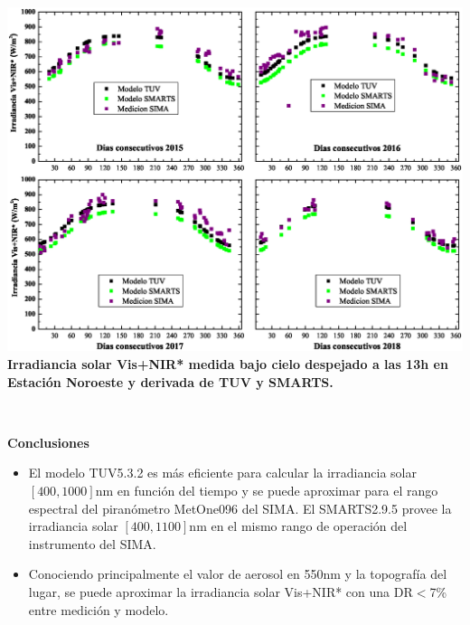 \documentclass{article}
\begin{document}
\hspace{1.2cm}
\begin{minipage}{0.45\linewidth}
\includegraphics[scale=0.43]{images/Graph4years.eps}\\
\changefontsizes{10pt} \textbf{\textcolor{ver}{
Irradiancia solar Vis+NIR* medida bajo cielo
despejado  a las 13h en Estación Noroeste y derivada de TUV y SMARTS.}}
\end{minipage}\\
\begin{minipage}{0.60\linewidth}
\begin{center}
\begin{shaded}
\textbf{\textcolor{ver}{Conclusiones}}
\end{shaded}
\end{center}
\begin{itemize}
    \item El modelo TUV5.3.2 es más eficiente para calcular la irradiancia solar $\left[400,1000\right]$nm en función del tiempo y se puede aproximar para el rango espectral del piranómetro MetOne096 del SIMA. El SMARTS2.9.5 provee la irradiancia solar $\left[400,1100\right]$nm en el mismo rango de operación del instrumento del SIMA.
    \item Conociendo principalmente el valor de aerosol en 550nm y la topografía del lugar, se puede aproximar la irradiancia solar Vis+NIR* con una DR$<$7\% entre medición y modelo. 
\end{itemize}
\end{minipage}
\hspace{1cm}\vspace{0.5cm}
\end{document}
